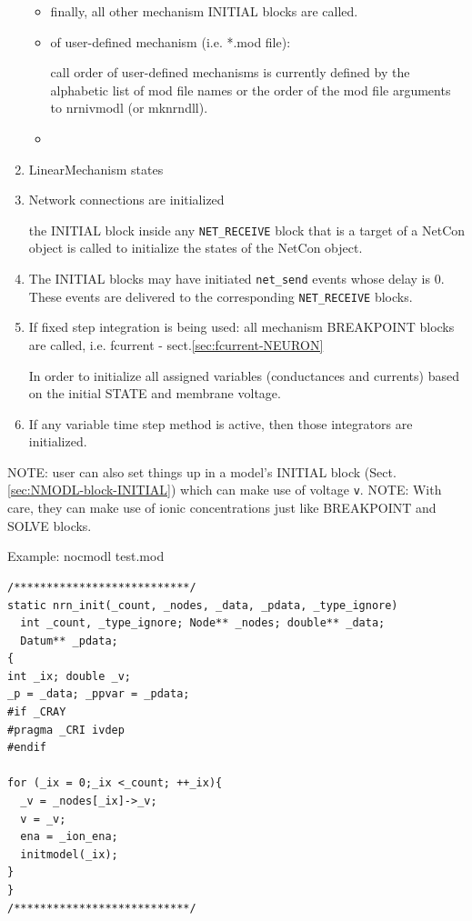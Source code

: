 \begin{enumerate}
\begin{itemize}
  \item finally, all other mechanism INITIAL blocks are called.
  
  \item of user-defined mechanism (i.e. *.mod file):
  
  call order of user-defined mechanisms is currently defined by the alphabetic
  list of mod file names or the order of the mod file arguments to nrnivmodl (or
  mknrndll).

  \item 
\end{itemize}

   \item LinearMechanism states
   
   \item Network connections are initialized
   
   
the INITIAL block inside any \verb!NET_RECEIVE! block that is a target of a
NetCon object is called to initialize the states of the NetCon object.

    \item The INITIAL blocks may have initiated \verb!net_send! events whose
delay is 0. These events are delivered to the corresponding \verb!NET_RECEIVE!
blocks.

  \item If fixed step integration is being used: 
  all mechanism BREAKPOINT
blocks are called, i.e. fcurrent - sect.\ref{sec:fcurrent-NEURON}

In order to initialize all assigned variables (conductances and currents)
based on the initial STATE and membrane voltage.

  \item If any variable time step method is active, then those integrators are
  initialized.
  
\end{enumerate}




NOTE: user can also set things up in a model's INITIAL block
(Sect.\ref{sec:NMODL-block-INITIAL}) which can make use of voltage \verb!v!.
NOTE: With care, they can make use of ionic concentrations just like BREAKPOINT
and SOLVE blocks.

Example: nocmodl test.mod
\begin{verbatim}
/***************************/
static nrn_init(_count, _nodes, _data, _pdata, _type_ignore)
  int _count, _type_ignore; Node** _nodes; double** _data;
  Datum** _pdata;
{ 
int _ix; double _v;
_p = _data; _ppvar = _pdata;
#if _CRAY
#pragma _CRI ivdep
#endif

for (_ix = 0;_ix <_count; ++_ix){
  _v = _nodes[_ix]->_v;
  v = _v;
  ena = _ion_ena;
  initmodel(_ix);
}
}
/***************************/
\end{verbatim}

